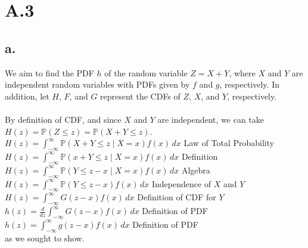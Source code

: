 \documentclass{article}
\newcommand{\1}{\mathbf{1}}
\renewcommand{\P}{\mathbb{P}}
\begin{document}
\section*{A.3}
{\Large 

\subsection*{a.}
We aim to find the PDF $h$ of the random variable $Z = X + Y$, where $X$ and $Y$ are independent random variables with PDFs given by $f$ and $g$, respectively. In addition, let $H$, $F$, and $G$ represent the CDFs of $Z$, $X$, and $Y$, respectively. \\ \\
By definition of CDF, and since $X$ and $Y$ are independent, we can take \\ 
$H(z) = \P(Z \leq z) = \P(X + Y \leq z)$. \\
$H(z) = \int_{-\infty}^{\infty} \P(X + Y \leq z \mid X = x) f(x) \,dx$ \hfill Law of Total Probability \\ 
$H(z) = \int_{-\infty}^{\infty} \P(x + Y \leq z \mid X = x) f(x) \,dx$ \hfill Definition \\
$H(z) = \int_{-\infty}^{\infty} \P(Y \leq z - x \mid X = x) f(x) \,dx$ \hfill Algebra \\ 
$H(z) = \int_{-\infty}^{\infty} \P(Y \leq z - x) f(x) \,dx$ \hfill Independence of $X$ and $Y$ \\
$H(z) = \int_{-\infty}^{\infty} G(z-x) f(x) \,dx$ \hfill Definition of CDF for $Y$ \\
$h(z) = \frac{d}{dz}\int_{-\infty}^{\infty} G(z-x) f(x) \,dx$ \hfill Definition of PDF \\
$h(z) = \int_{-\infty}^{\infty} g(z-x) f(x) \,dx$ \hfill Definition of PDF \\
as we sought to show.

}
\end{document}
